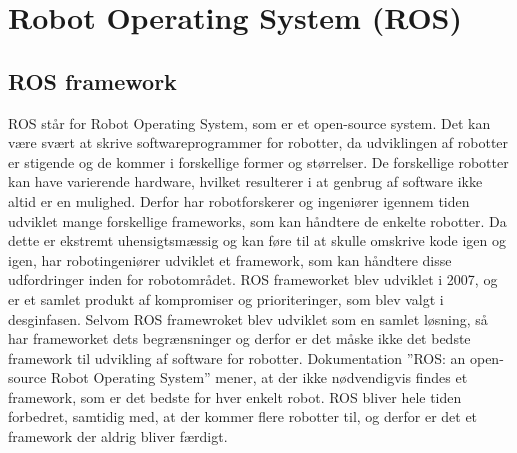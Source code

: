 \chapter{Robot Operating System (ROS)}\label{chap:ROS}
\section{ROS framework}
ROS står for Robot Operating System, som er et open-source system.
Det kan være svært at skrive softwareprogrammer for robotter, da udviklingen af robotter er stigende og de kommer i forskellige former og størrelser.
De forskellige robotter kan have varierende hardware, hvilket resulterer i at genbrug af software ikke altid er en mulighed.
Derfor har robotforskerer og ingeniører igennem tiden udviklet mange forskellige frameworks, som kan håndtere de enkelte robotter.
Da dette er ekstremt uhensigtsmæssig og kan føre til at skulle omskrive kode igen og igen, har robotingeniører udviklet et framework, som kan håndtere disse udfordringer inden for robotområdet.
ROS frameworket blev udviklet i 2007, og er et samlet produkt af kompromiser og prioriteringer, som blev valgt i desginfasen.
Selvom ROS framewroket blev udviklet som en samlet løsning, så har frameworket dets begrænsninger og derfor er det måske ikke det bedste framework til udvikling af software for robotter.
Dokumentation ''ROS: an open-source Robot Operating System'' mener, at der ikke nødvendigvis findes et framework, som er det bedste for hver enkelt robot.
ROS bliver hele tiden forbedret, samtidig med, at der kommer flere robotter til, og derfor er det et framework der aldrig bliver færdigt.

